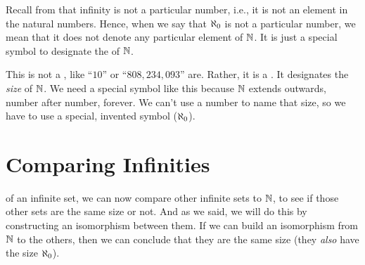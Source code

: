 \documentclass[../../../main.tex]{subfiles}
\begin{document}
\begin{aside}
  \begin{remark}
    Recall from  that infinity is not a particular number, i.e., it is not an element in the natural numbers. Hence, when we say that $\AlephZero/$ is not a particular number, we mean that it does not denote any particular element of $\Nats/$. It is just a special symbol to designate the  of $\Nats/$.
  \end{remark}
\end{aside}

This is not a , like ``$10$'' or ``$808,234,093$'' are. Rather, it is a . It designates the \emph{size} of $\Nats/$. We need a special symbol like this because $\Nats/$ extends outwards, number after number, forever. We can't use a number to name that size, so we have to use a special, invented symbol ($\AlephZero/$).


\section{Comparing Infinities}

 of an infinite set, we can now compare other infinite sets to $\Nats/$, to see if those other sets are the same size or not. And as we said, we will do this by constructing an isomorphism between them. If we can build an isomorphism from $\Nats/$ to the others, then we can conclude that they are the same size (they \emph{also} have the size $\AlephZero/$).
\end{document}
